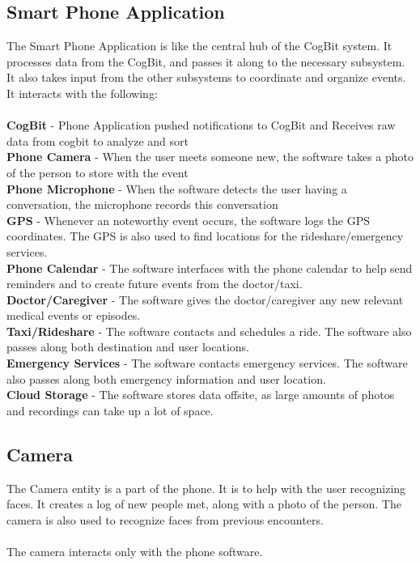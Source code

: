\documentclass[12pt]{article}
\begin{document}
\begin{multicols}{2}
\subsection*{Smart Phone Application}
The Smart Phone Application is like the central hub of the CogBit system.  It processes data from the CogBit, and passes it along to the necessary subsystem.  It also takes input from the other subsystems to coordinate and organize events. It interacts with the following:\\
\\
\textbf{CogBit} - Phone Application pushed notifications to CogBit and Receives raw data from cogbit to analyze and sort\\
\textbf{Phone Camera} - When the user meets someone new, the software takes a photo of the person to store with the event\\
\textbf{Phone Microphone} - When the software detects the user having a conversation, the microphone records this conversation\\
\textbf{GPS} - Whenever an noteworthy event occurs, the software logs the GPS coordinates.  The GPS is also used to find locations for the rideshare/emergency services.\\
\textbf{Phone Calendar} - The software interfaces with the phone calendar to help send reminders and to create future events from the doctor/taxi.\\
\textbf{Doctor/Caregiver} - The software gives the doctor/caregiver any new relevant medical events or episodes.\\
\textbf{Taxi/Rideshare} - The software contacts and schedules a ride.  The software also passes along both destination and user locations.\\
\textbf{Emergency Services} -  The software contacts emergency services.  The software also passes along both emergency information and user location.\\
\textbf{Cloud Storage} - The software stores data offsite, as large amounts of photos and recordings can take up a lot of space.


\subsection*{Camera}
The Camera entity is a part of the phone.  It is to help with the user recognizing faces.  It creates a log of new people met, along with a photo of the person.  The camera is also used to recognize faces from previous encounters.\\
\\
The camera interacts only with the phone software.


\end{multicols}
\end{document}
